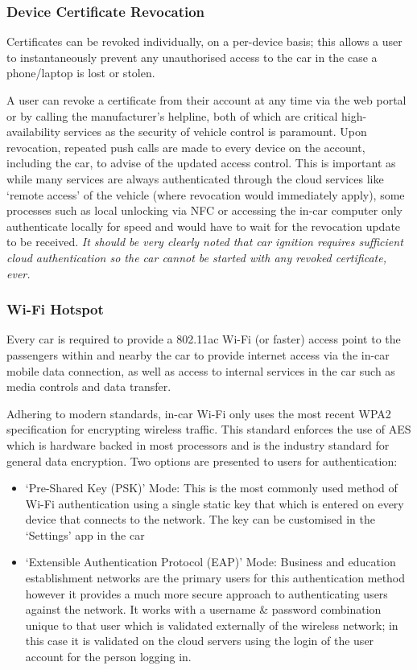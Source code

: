 \documentclass{article}
\begin{document}
\subsubsection{Device Certificate Revocation}
Certificates can be revoked individually, on a per-device basis; this allows a user to instantaneously prevent any unauthorised access to the car in the case a phone/laptop is lost or stolen.

A user can revoke a certificate from their account at any time via the web portal or by calling the manufacturer's helpline, both of which are critical high-availability services as the security of vehicle control is paramount. Upon revocation, repeated push calls are made to every device on the account, including the car, to advise of the updated access  control. This is important as while many services are always authenticated through the cloud services like `remote access' of the vehicle (where revocation would immediately apply), some processes such as local unlocking via NFC or accessing the in-car computer only authenticate locally for speed and would have to wait for the revocation update to be received. \textit{It should be very clearly noted that car ignition requires sufficient cloud authentication so the car cannot be started with any revoked certificate, ever.}

\subsubsection{Wi-Fi Hotspot}
Every car is required to provide a 802.11ac Wi-Fi (or faster) access point to the passengers within and nearby the car to provide internet access via the in-car mobile data connection, as well as access to internal services in the car such as media controls and data transfer.

Adhering to modern standards, in-car Wi-Fi only uses the most recent WPA2 specification for encrypting wireless traffic. This standard enforces the use of AES which is hardware backed in most processors and is the industry standard for general data encryption. Two options are presented to users for authentication:
\begin{itemize}
	\item `Pre-Shared Key (PSK)' Mode: This is the most commonly used method of Wi-Fi authentication using a single static key that which is entered on every device that connects to the network. The key can be customised in the `Settings' app in the car
	\item `Extensible Authentication Protocol (EAP)' Mode: Business and education establishment networks are the primary users for this authentication method however it provides a much more secure approach to authenticating users against the network. It works with a username \& password combination unique to that user which is validated externally of the wireless network; in this case it is validated on the cloud servers using the login of the user account for the person logging in.
\end{itemize}
\end{document}
